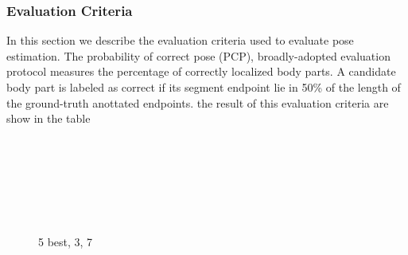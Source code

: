 \subsubsection{Evaluation Criteria}
In this section we describe the evaluation criteria used to evaluate pose estimation.
The probability of correct pose (PCP), broadly-adopted evaluation protocol measures
the percentage of correctly localized body parts. A candidate body part is labeled as
correct if its segment endpoint lie in 50\% of the length of the ground-truth anottated
endpoints. the result of this evaluation criteria are show in the table 

\subsubsection{}

\begin{figure}
\begin{adjustwidth}{-1in}{-1in} 
\label{fig:res537}
\centering     %
{}
\\
\\
\\
\\
\\
\caption{5 best, 3, 7}
\end{adjustwidth}
\end{figure}


